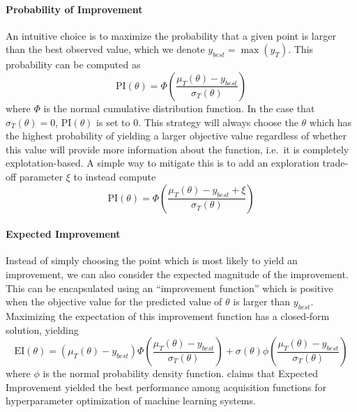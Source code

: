 \paragraph{Probability of Improvement}

An intuitive choice is to maximize the probability that a given point is larger than the best observed value, which we denote $y_{best} = \max(y_T)$.
This probability can be computed as
\begin{equation}
        \mathrm{PI}(\theta) = \Phi\left(\frac{\mu_T(\theta) - y_{best}}{\sigma_T(\theta)}\right)
        \label{eq:probability_of_improvement}
\end{equation}
where $\Phi$ is the normal cumulative distribution function.
In the case that $\sigma_T(\theta) = 0$, $\mathrm{PI}(\theta)$ is set to $0$.
This strategy will always choose the $\theta$ which has the highest probability of yielding a larger objective value regardless of whether this value will provide more information about the function, i.e.\ it is completely explotation-based.
A simple way to mitigate this is to add an exploration trade-off parameter $\xi$ to instead compute
\begin{equation}
        \mathrm{PI}(\theta) = \Phi\left(\frac{\mu_T(\theta) - y_{best} + \xi}{\sigma_T(\theta)}\right)
\end{equation}

\paragraph{Expected Improvement}

Instead of simply choosing the point which is most likely to yield an improvement, we can also consider the expected magnitude of the improvement.
This can be encapsulated using an ``improvement function'' which is positive when the objective value for the predicted value of $\theta$ is larger than $y_{best}$.
Maximizing the expectation of this improvement function has a closed-form solution, yielding
\begin{equation}
        \mathrm{EI}(\theta) = (\mu_T(\theta) - y_{best})\Phi\left(\frac{\mu_T(\theta) - y_{best}}{\sigma_T(\theta)}\right) + \sigma(\theta)\phi\left(\frac{\mu_T(\theta) - y_{best}}{\sigma_T(\theta)}\right)
\end{equation}
where $\phi$ is the normal probability density function.
\cite{snoek2012practical} claims that Expected Improvement yielded the best performance among acquisition functions for hyperparameter optimization of machine learning systems.

